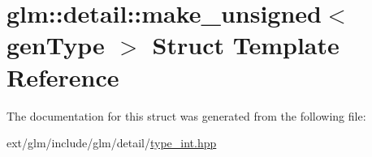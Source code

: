 \hypertarget{structglm_1_1detail_1_1make__unsigned}{\section{glm\-:\-:detail\-:\-:make\-\_\-unsigned$<$ gen\-Type $>$ Struct Template Reference}
\label{structglm_1_1detail_1_1make__unsigned}
}


The documentation for this struct was generated from the following file\-:\begin{DoxyCompactItemize}
\item 
ext/glm/include/glm/detail/\hyperlink{type__int_8hpp}{type\-\_\-int.\-hpp}\end{DoxyCompactItemize}
